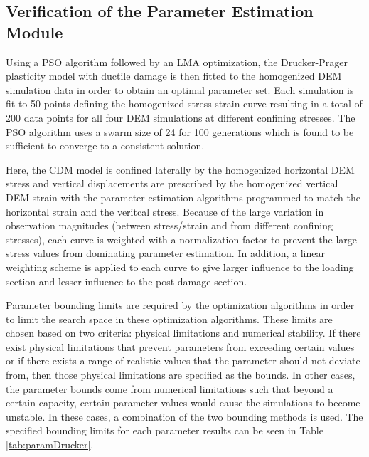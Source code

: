 \subsection{Verification of the Parameter Estimation Module}

Using a PSO algorithm followed by an LMA optimization, the Drucker-Prager plasticity model with ductile damage is then fitted to the homogenized DEM simulation data in order to obtain an optimal parameter set. Each simulation is fit to 50 points defining the homogenized stress-strain curve resulting in a total of 200 data points for all four DEM simulations at different confining stresses. The PSO algorithm uses a swarm size of 24 for 100 generations which is found to be sufficient to converge to a consistent solution. 

Here, the CDM model is confined laterally by the homogenized horizontal DEM stress and vertical displacements are prescribed by the homogenized vertical DEM strain with the parameter estimation algorithms programmed to match the horizontal strain and the veritcal stress. Because of the large variation in observation magnitudes (between stress/strain and from different confining stresses), each curve is weighted with a normalization factor to prevent the large stress values from dominating parameter estimation. In addition, a linear weighting scheme is applied to each curve to give larger influence to the loading section and lesser influence to the post-damage section.

Parameter bounding limits are required by the optimization algorithms in order to limit the search space in these optimization algorithms. These limits are chosen based on two criteria: physical limitations and numerical stability. If there exist physical limitations that prevent parameters from exceeding certain values or if there exists a range of realistic values that the parameter should not deviate from, then those physical limitations are specified as the bounds. In other cases, the parameter bounds come from numerical limitations such that beyond a certain capacity, certain parameter values would cause the simulations to become unstable. In these cases, a combination of the two bounding methods is used. The specified bounding limits for each parameter results can be seen in Table \ref{tab:paramDrucker}.

